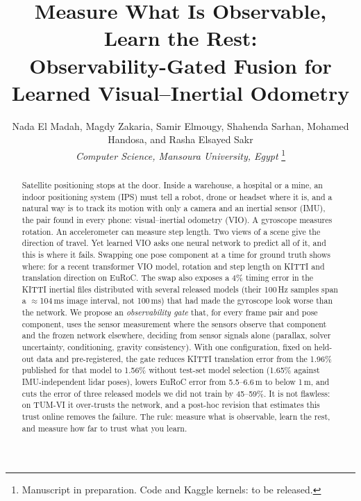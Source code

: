 \documentclass[letterpaper,journal]{IEEEtran}
\begin{document}
\title{Measure What Is Observable, Learn the Rest:\\Observability-Gated Fusion for Learned Visual--Inertial Odometry}

\author{Nada El Madah, Magdy Zakaria, Samir Elmougy, Shahenda Sarhan, Mohamed Handosa, and Rasha Elsayed Sakr\\
\textit{Computer Science, Mansoura University, Egypt}%
\thanks{Manuscript in preparation. Code and Kaggle kernels: to be released.}}


\maketitle

\begin{abstract}
Satellite positioning stops at the door. Inside a warehouse, a hospital or a mine, an indoor positioning system (IPS) must tell a robot, drone or headset where it is, and a natural way is to track its motion with only a camera and an inertial sensor (IMU), the pair found in every phone: visual--inertial odometry (VIO). A gyroscope measures rotation. An accelerometer can measure step length. Two views of a scene give the direction of travel. Yet learned VIO asks one neural network to predict all of it, and this is where it fails. Swapping one pose component at a time for ground truth shows where: for a recent transformer VIO model, rotation and step length on KITTI and translation direction on EuRoC. The swap also exposes a 4\% timing error in the KITTI inertial files distributed with several released models (their 100\,Hz samples span a $\approx$104\,ms image interval, not 100\,ms) that had made the gyroscope look worse than the network. We propose an \emph{observability gate} that, for every frame pair and pose component, uses the sensor measurement where the sensors observe that component and the frozen network elsewhere, deciding from sensor signals alone (parallax, solver uncertainty, conditioning, gravity consistency). With one configuration, fixed on held-out data and pre-registered, the gate reduces KITTI translation error from the 1.96\% published for that model to 1.56\% without test-set model selection (1.65\% against IMU-independent lidar poses), lowers EuRoC error from 5.5--6.6\,m to below 1\,m, and cuts the error of three released models we did not train by 45--59\%. It is not flawless: on TUM-VI it over-trusts the network, and a post-hoc revision that estimates this trust online removes the failure. The rule: measure what is observable, learn the rest, and measure how far to trust what you learn.
\end{abstract}
\end{document}
